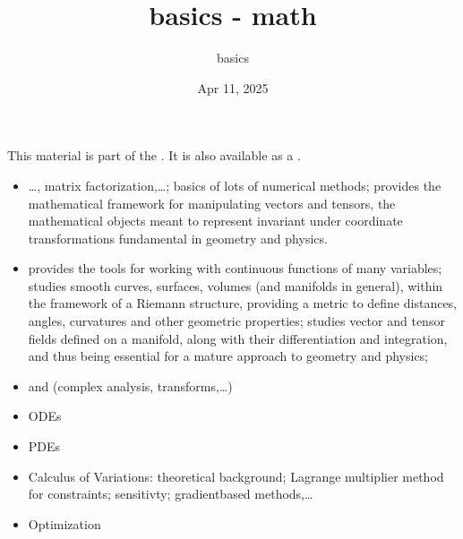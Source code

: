 \documentclass[letterpaper,10pt,english]{jupyterBook}
\title{basics - math}
\date{Apr 11, 2025}
\author{basics}
\begin{document}
\pagestyle{empty}
\sphinxmaketitle
\pagestyle{plain}
\sphinxtableofcontents
\pagestyle{normal}
\label{\detokenize{intro::doc}}


\sphinxAtStartPar
This material is part of the . It is also available as a .

\sphinxAtStartPar
{}
\begin{itemize}
\item {} 
\sphinxAtStartPar
{} …, matrix factorization,…; basics of lots of numerical methods;  provides the mathematical framework for manipulating vectors and tensors, the mathematical objects meant to represent  \sphinxhyphen{} invariant under coordinate transformations \sphinxhyphen{} fundamental in geometry and physics.

\item {} 
\sphinxAtStartPar
{} provides the tools for working with continuous functions of many variables;  studies smooth curves, surfaces, volumes (and manifolds in general), within the framework of a Riemann structure, providing a metric to define distances, angles, curvatures and other geometric properties;  studies vector and tensor fields defined on a manifold, along with their differentiation and integration, and thus being essential for a mature approach to geometry and physics;

\item {} 
\sphinxAtStartPar
{} and  (complex analysis, transforms,…)

\item {} 
\sphinxAtStartPar
ODEs

\item {} 
\sphinxAtStartPar
PDEs

\item {} 
\sphinxAtStartPar
Calculus of Variations: theoretical background; Lagrange multiplier method for constraints; sensitivty; gradient\sphinxhyphen{}based methods,…

\item {} 
\sphinxAtStartPar
Optimization

\end{itemize}
\end{document}

